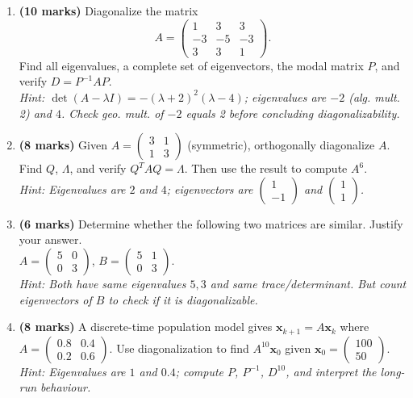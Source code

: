 \documentclass[12pt,a4paper]{article}
\begin{document}
\begin{enumerate}[leftmargin=*, label=\textbf{D\arabic*.}]
  \item \textbf{(10 marks)} Diagonalize the matrix
  \[
    A = \begin{pmatrix} 1 & 3 & 3 \\ -3 & -5 & -3 \\ 3 & 3 & 1 \end{pmatrix}.
  \]
  Find all eigenvalues, a complete set of eigenvectors, the modal matrix $P$, and verify $D = P^{-1}AP$. \\
  \textit{Hint: $\det(A-\lambda I) = -(\lambda+2)^2(\lambda-4)$; eigenvalues are $-2$ (alg. mult. 2) and $4$.
  Check geo. mult. of $-2$ equals 2 before concluding diagonalizability.}

  \item \textbf{(8 marks)} Given $A = \begin{pmatrix} 3 & 1 \\ 1 & 3 \end{pmatrix}$ (symmetric), orthogonally diagonalize $A$. Find $Q$, $\Lambda$, and verify $Q^TAQ = \Lambda$.
  Then use the result to compute $A^6$. \\
  \textit{Hint: Eigenvalues are $2$ and $4$; eigenvectors are $\begin{pmatrix}1\\-1\end{pmatrix}$ and $\begin{pmatrix}1\\1\end{pmatrix}$.}

  \item \textbf{(6 marks)} Determine whether the following two matrices are similar. Justify your answer. \\
  $A = \begin{pmatrix} 5 & 0 \\ 0 & 3 \end{pmatrix}$, \quad $B = \begin{pmatrix} 5 & 1 \\ 0 & 3 \end{pmatrix}$. \\
  \textit{Hint: Both have same eigenvalues $5, 3$ and same trace/determinant. But count eigenvectors of $B$ to check if it is diagonalizable.}

  \item \textbf{(8 marks)} A discrete-time population model gives $\mathbf{x}_{k+1} = A\mathbf{x}_k$ where
  $A = \begin{pmatrix}0.8 & 0.4 \\ 0.2 & 0.6\end{pmatrix}$.
  Use diagonalization to find $A^{10}\mathbf{x}_0$ given $\mathbf{x}_0 = \begin{pmatrix}100\\50\end{pmatrix}$. \\
  \textit{Hint: Eigenvalues are $1$ and $0.4$; compute $P$, $P^{-1}$, $D^{10}$, and interpret the long-run behaviour.}


\end{enumerate}
\end{document}
